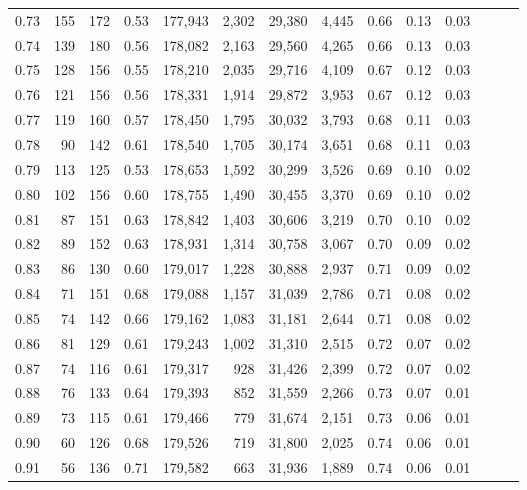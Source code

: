\begin{tabular}{rrrrrrrrrrrrrr}
0.73 &     155 &  172 &  0.53 &  177,943 &    2,302 &  29,380 &   4,445 &  0.66 &  0.13 &      0.03 \\
0.74 &     139 &  180 &  0.56 &  178,082 &    2,163 &  29,560 &   4,265 &  0.66 &  0.13 &      0.03 \\
0.75 &     128 &  156 &  0.55 &  178,210 &    2,035 &  29,716 &   4,109 &  0.67 &  0.12 &      0.03 \\
0.76 &     121 &  156 &  0.56 &  178,331 &    1,914 &  29,872 &   3,953 &  0.67 &  0.12 &      0.03 \\
0.77 &     119 &  160 &  0.57 &  178,450 &    1,795 &  30,032 &   3,793 &  0.68 &  0.11 &      0.03 \\
0.78 &      90 &  142 &  0.61 &  178,540 &    1,705 &  30,174 &   3,651 &  0.68 &  0.11 &      0.03 \\
0.79 &     113 &  125 &  0.53 &  178,653 &    1,592 &  30,299 &   3,526 &  0.69 &  0.10 &      0.02 \\
0.80 &     102 &  156 &  0.60 &  178,755 &    1,490 &  30,455 &   3,370 &  0.69 &  0.10 &      0.02 \\
0.81 &      87 &  151 &  0.63 &  178,842 &    1,403 &  30,606 &   3,219 &  0.70 &  0.10 &      0.02 \\
0.82 &      89 &  152 &  0.63 &  178,931 &    1,314 &  30,758 &   3,067 &  0.70 &  0.09 &      0.02 \\
0.83 &      86 &  130 &  0.60 &  179,017 &    1,228 &  30,888 &   2,937 &  0.71 &  0.09 &      0.02 \\
0.84 &      71 &  151 &  0.68 &  179,088 &    1,157 &  31,039 &   2,786 &  0.71 &  0.08 &      0.02 \\
0.85 &      74 &  142 &  0.66 &  179,162 &    1,083 &  31,181 &   2,644 &  0.71 &  0.08 &      0.02 \\
0.86 &      81 &  129 &  0.61 &  179,243 &    1,002 &  31,310 &   2,515 &  0.72 &  0.07 &      0.02 \\
0.87 &      74 &  116 &  0.61 &  179,317 &      928 &  31,426 &   2,399 &  0.72 &  0.07 &      0.02 \\
0.88 &      76 &  133 &  0.64 &  179,393 &      852 &  31,559 &   2,266 &  0.73 &  0.07 &      0.01 \\
0.89 &      73 &  115 &  0.61 &  179,466 &      779 &  31,674 &   2,151 &  0.73 &  0.06 &      0.01 \\
0.90 &      60 &  126 &  0.68 &  179,526 &      719 &  31,800 &   2,025 &  0.74 &  0.06 &      0.01 \\
0.91 &      56 &  136 &  0.71 &  179,582 &      663 &  31,936 &   1,889 &  0.74 &  0.06 &      0.01 \\

\end{tabular}
